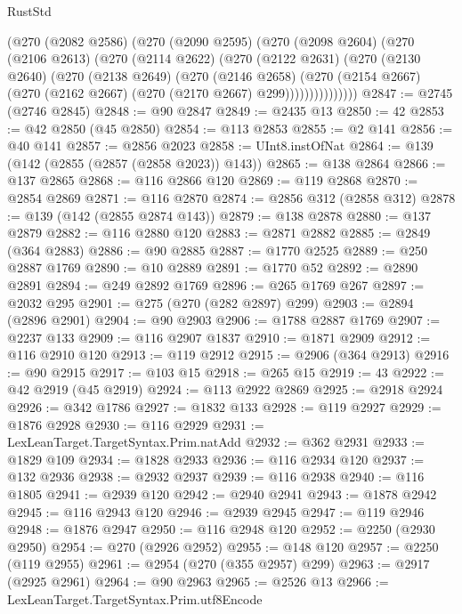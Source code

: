\begin{lexlean}{RustStd}
\begin{coremodule}
          (@270
            (@2082 @2586)
            (@270
              (@2090 @2595)
              (@270
                (@2098 @2604)
                (@270
                  (@2106 @2613)
                  (@270
                    (@2114 @2622)
                    (@270
                      (@2122 @2631)
                      (@270
                        (@2130 @2640)
                        (@270
                          (@2138 @2649)
                          (@270
                            (@2146 @2658)
                            (@270
                              (@2154 @2667)
                              (@270 (@2162 @2667) (@270 (@2170 @2667) @299)))))))))))))))
@2847 := @2745 (@2746 @2845)
@2848 := @90 @2847
@2849 := @2435 @13
@2850 := 42
@2853 := @42 @2850 (@45 @2850)
@2854 := @113 @2853
@2855 := @2 @141
@2856 := @40 @141
@2857 := @2856 @2023
@2858 := UInt8.instOfNat
@2864 := @139 (@142 (@2855 (@2857 (@2858 @2023)) @143))
@2865 := @138 @2864
@2866 := @137 @2865
@2868 := @116 @2866 @120
@2869 := @119 @2868
@2870 := @2854 @2869
@2871 := @116 @2870
@2874 := @2856 @312 (@2858 @312)
@2878 := @139 (@142 (@2855 @2874 @143))
@2879 := @138 @2878
@2880 := @137 @2879
@2882 := @116 @2880 @120
@2883 := @2871 @2882
@2885 := @2849 (@364 @2883)
@2886 := @90 @2885
@2887 := @1770 @2525
@2889 := @250 @2887 @1769
@2890 := @10 @2889
@2891 := @1770 @52
@2892 := @2890 @2891
@2894 := @249 @2892 @1769
@2896 := @265 @1769 @267
@2897 := @2032 @295
@2901 := @275 (@270 (@282 @2897) @299)
@2903 := @2894 (@2896 @2901)
@2904 := @90 @2903
@2906 := @1788 @2887 @1769
@2907 := @2237 @133
@2909 := @116 @2907 @1837
@2910 := @1871 @2909
@2912 := @116 @2910 @120
@2913 := @119 @2912
@2915 := @2906 (@364 @2913)
@2916 := @90 @2915
@2917 := @103 @15
@2918 := @265 @15
@2919 := 43
@2922 := @42 @2919 (@45 @2919)
@2924 := @113 @2922 @2869
@2925 := @2918 @2924
@2926 := @342 @1786
@2927 := @1832 @133
@2928 := @119 @2927
@2929 := @1876 @2928
@2930 := @116 @2929
@2931 := LexLeanTarget.TargetSyntax.Prim.natAdd
@2932 := @362 @2931
@2933 := @1829 @109
@2934 := @1828 @2933
@2936 := @116 @2934 @120
@2937 := @132 @2936
@2938 := @2932 @2937
@2939 := @116 @2938
@2940 := @116 @1805
@2941 := @2939 @120
@2942 := @2940 @2941
@2943 := @1878 @2942
@2945 := @116 @2943 @120
@2946 := @2939 @2945
@2947 := @119 @2946
@2948 := @1876 @2947
@2950 := @116 @2948 @120
@2952 := @2250 (@2930 @2950)
@2954 := @270 (@2926 @2952)
@2955 := @148 @120
@2957 := @2250 (@119 @2955)
@2961 := @2954 (@270 (@355 @2957) @299)
@2963 := @2917 (@2925 @2961)
@2964 := @90 @2963
@2965 := @2526 @13
@2966 := LexLeanTarget.TargetSyntax.Prim.utf8Encode

\end{coremodule}
\end{lexlean}
